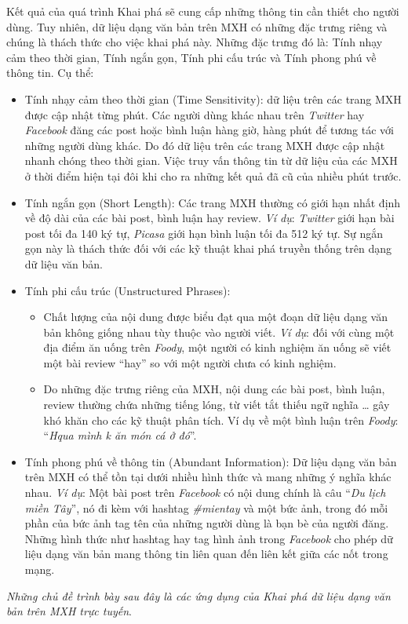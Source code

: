 \documentclass[12pt]{extarticle}
\begin{document}
			\par Kết quả của quá trình Khai phá sẽ cung cấp những thông tin cần thiết cho người dùng. Tuy nhiên, dữ liệu dạng văn bản trên MXH có những đặc trưng riêng và chúng là thách thức cho việc khai phá này. Những đặc trưng đó là: Tính nhạy cảm theo thời gian, Tính ngắn gọn, Tính phi cấu trúc và Tính phong phú về thông tin. Cụ thể:
			\begin{itemize}
				\item Tính nhạy cảm theo thời gian (Time Sensitivity): dữ liệu trên các trang MXH được cập nhật từng phút. Các người dùng khác nhau trên \textit{Twitter} hay \textit{Facebook} đăng các post hoặc bình luận hàng giờ, hàng phút để tương tác với những người dùng khác. Do đó dữ liệu trên các trang MXH được cập nhật nhanh chóng theo thời gian. Việc truy vấn thông tin từ dữ liệu của các MXH ở thời điểm hiện tại đôi khi cho ra những kết quả đã cũ của nhiều phút trước.  
				\item Tính ngắn gọn (Short Length): Các trang MXH thường có giới hạn nhất định về độ dài của các bài post, bình luận hay review. \textit{Ví dụ}: \textit{Twitter} giới hạn bài post tối đa 140 ký tự, \textit{Picasa} giới hạn bình luận tối đa 512 ký tự. Sự ngắn gọn này là thách thức đối với các kỹ thuật khai phá truyền thống trên dạng dữ liệu văn bản.
				\item Tính phi cấu trúc (Unstructured Phrases):
					\begin{itemize}
						\item Chất lượng của nội dung được biểu đạt qua một đoạn dữ liệu dạng văn bản không giống nhau tùy thuộc vào người viết. \textit{Ví dụ}: đối với cùng một địa điểm ăn uống trên \textit{Foody}, một người có kinh nghiệm ăn uống sẽ viết một bài review “hay” so với một người chưa có kinh nghiệm.
						\item Do những đặc trưng riêng của MXH, nội dung các bài post, bình luận, review thường chứa những tiếng lóng, từ viết tắt thiếu ngữ nghĩa … gây khó khăn cho các kỹ thuật phân tích. Ví dụ về một bình luận trên \textit{Foody}: “\textit{Hqua mình k ăn món cá ở đó}”.
					\end{itemize}
				\item Tính phong phú về thông tin (Abundant Information): Dữ liệu dạng văn bản trên MXH có thể tồn tại dưới nhiều hình thức và mang những ý nghĩa khác nhau. \textit{Ví dụ}: Một bài post trên \textit{Facebook} có nội dung chính là câu “\textit{Du lịch miền Tây}”, nó đi kèm với hashtag \textit{\#mientay} và một bức ảnh, trong đó mỗi phần của bức ảnh tag tên của những người dùng là bạn bè của người đăng. Những hình thức như hashtag hay tag hình ảnh trong \textit{Facebook} cho phép dữ liệu dạng văn bản mang thông tin liên quan đến liên kết giữa các nốt trong mạng.
			\end{itemize}
			\par \textit{Những chủ đề trình bày sau đây là các ứng dụng của Khai phá dữ liệu dạng văn bản trên MXH trực tuyến}.
					
\end{document}
